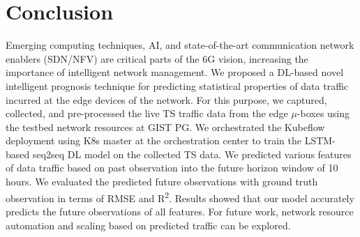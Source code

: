 \documentclass[10pt, conference]{IEEEtran}
\begin{document}
\section{Conclusion}
\label{sec:Conclusion}
Emerging computing techniques, AI, and state-of-the-art communication network enablers (SDN/NFV) are critical parts of the 6G vision, increasing the importance of intelligent network management. 
We proposed a DL-based novel intelligent prognosis technique for predicting statistical properties of data traffic incurred at the edge devices of the network. 
For this purpose, we captured, collected, and pre-processed the live TS traffic data from the edge $\mu$-boxes using the testbed network resources at GIST PG.
We orchestrated the Kubeflow deployment using K8s master at the orchestration center to train the LSTM-based seq2seq DL model on the collected TS data. We predicted various features of data traffic based on past observation into the future horizon window of 10 hours. We evaluated the predicted future observations with ground truth observation in terms of RMSE and R\textsuperscript{2}. Results showed that our model accurately predicts the future observations of all features.
For future work, network resource automation and scaling based on predicted traffic can be explored. 
\end{document}
